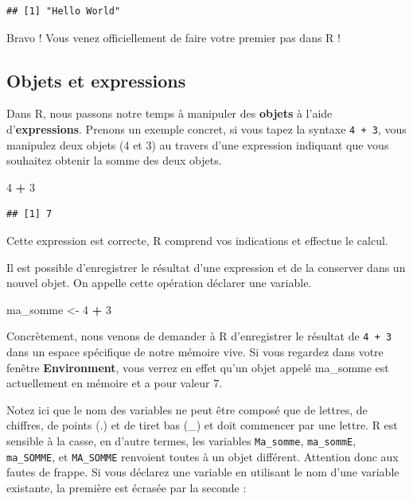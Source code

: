 \documentclass[
  11pt,
  french,
]{book}
\makeatletter
\newenvironment{Shaded}{\begin{snugshade}}{\end{snugshade}}
\newcommand{\DecValTok}[1]{\textcolor[rgb]{0.00,0.00,0.81}{#1}}
\newcommand{\NormalTok}[1]{#1}
\newcommand{\OperatorTok}[1]{\textcolor[rgb]{0.81,0.36,0.00}{\textbf{#1}}}
\newcommand{\StringTok}[1]{\textcolor[rgb]{0.31,0.60,0.02}{#1}}
\newenvironment{kframe}{%
\medskip{}
\setlength{\fboxsep}{.8em}
 \def\at@end@of@kframe{}%
 \ifinner\ifhmode%
  \def\at@end@of@kframe{\end{minipage}}%
  \begin{minipage}{\columnwidth}%
 \fi\fi%
 \def\FrameCommand##1{\hskip\@totalleftmargin \hskip-\fboxsep
 \colorbox{shadecolor}{##1}\hskip-\fboxsep
     \hskip-\linewidth \hskip-\@totalleftmargin \hskip\columnwidth}%
 \MakeFramed {\advance\hsize-\width
   \@totalleftmargin\z@ \linewidth\hsize
   \@setminipage}}%
 {\par\unskip\endMakeFramed%
 \at@end@of@kframe}
\renewenvironment{Shaded}{\begin{kframe}}{\end{kframe}}
\makeatother
\begin{document}
\begin{verbatim}
## [1] "Hello World"
\end{verbatim}

Bravo ! Vous venez officiellement de faire votre premier pas dans R !

\hypertarget{sect0132}{%
\subsection{Objets et expressions}\label{sect0132}}

Dans R, nous passons notre temps à manipuler des \textbf{objets} à l'aide d'\textbf{expressions}. Prenons un exemple concret, si vous tapez la syntaxe \texttt{4\ +\ 3}, vous manipulez deux objets (4 et 3) au travers d'une expression indiquant que vous souhaitez obtenir la somme des deux objets.

\begin{Shaded}
\begin{Highlighting}[]
\DecValTok{4} \OperatorTok{+}\StringTok{ }\DecValTok{3}
\end{Highlighting}
\end{Shaded}

\begin{verbatim}
## [1] 7
\end{verbatim}

Cette expression est correcte, R comprend vos indications et effectue le calcul.

Il est possible d'enregistrer le résultat d'une expression et de la conserver dans un nouvel objet. On appelle cette opération déclarer une variable.

\begin{Shaded}
\begin{Highlighting}[]
\NormalTok{ma_somme <-}\StringTok{ }\DecValTok{4} \OperatorTok{+}\StringTok{ }\DecValTok{3}
\end{Highlighting}
\end{Shaded}

Concrètement, nous venons de demander à R d'enregistrer le résultat de \texttt{4\ +\ 3} dans un espace spécifique de notre mémoire vive. Si vous regardez dans votre fenêtre \textbf{Environment}, vous verrez en effet qu'un objet appelé ma\_somme est actuellement en mémoire et a pour valeur 7.

Notez ici que le nom des variables ne peut être composé que de lettres, de chiffres, de points (.) et de tiret bas (\_) et doit commencer par une lettre. R est sensible à la casse, en d'autre termes, les variables \texttt{Ma\_somme}, \texttt{ma\_sommE}, \texttt{ma\_SOMME}, et \texttt{MA\_SOMME} renvoient toutes à un objet différent. Attention donc aux fautes de frappe. Si vous déclarez une variable en utilisant le nom d'une variable existante, la première est écrasée par la seconde :
\end{document}
